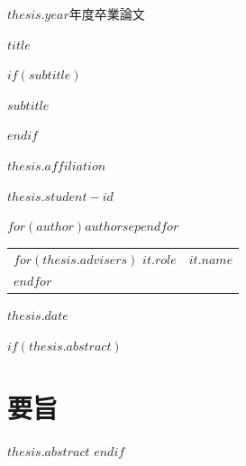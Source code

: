\begin{titlepage}
  \centering
  \vspace*{10mm}
  {\huge $thesis.year$年度\hspace{5mm}卒業論文\par}
  \vfill
  {\huge\bfseries $title$\par}
$if(subtitle)$
  \vspace{5mm}
  {\LARGE $subtitle$\par}
$endif$
  \vfill
  \vspace*{20mm}
  {\LARGE $thesis.affiliation$\par}
  \vspace{5mm}
  {\LARGE $thesis.student-id$\par}
  \vspace{2mm}
  {\LARGE $for(author)$$author$$sep$\quad $endfor$\par}
  \vspace{40mm}
  {\Large
  \begin{tabular}{ll}
$for(thesis.advisers)$
    $it.role$ & $it.name$ \\
$endfor$
  \end{tabular}\par}
  \vspace{20mm}
  {\Large $thesis.date$\par}
\end{titlepage}

$if(thesis.abstract)$
\chapter*{要旨}
\thispagestyle{empty}
$thesis.abstract$
$endif$

